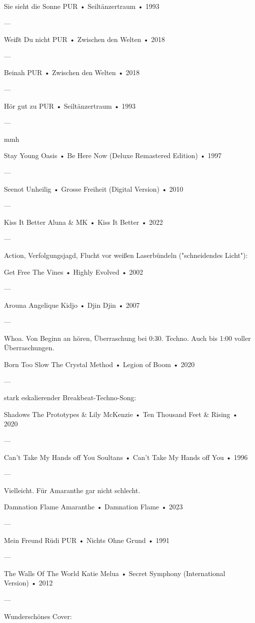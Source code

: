Sie sieht die Sonne
PUR
 •
Seiltänzertraum
 •
1993

—

Weißt Du nicht
PUR
 •
Zwischen den Welten
 •
2018

—

Beinah
PUR
 •
Zwischen den Welten
 •
2018

—

Hör gut zu
PUR
 •
Seiltänzertraum
 •
1993

—

mmh ~

Stay Young
Oasis
 •
Be Here Now (Deluxe Remastered Edition)
 •
1997

—

Seenot
Unheilig
 •
Grosse Freiheit (Digital Version)
 •
2010

—

Kiss It Better
Aluna
 &
MK
 •
Kiss It Better
 • 2022

—

Action, Verfolgungsjagd, Flucht vor weißen Laserbündeln ("schneidendes Licht"):

Get Free
The Vines
 •
Highly Evolved
 • 2002

—

Arouna
Angelique Kidjo
 •
Djin Djin
 • 2007

—

Whoa. Von Beginn an hören, Überraschung bei 0:30. Techno. Auch bis 1:00 voller Überraschungen.

Born Too Slow
The Crystal Method
 •
Legion of Boom
 • 2020

—

stark eskalierender Breakbeat-Techno-Song:

Shadows
The Prototypes
 &
Lily McKenzie
 •
Ten Thousand Feet & Rising
 • 2020

—

Can't Take My Hands off You
Soultans
 •
Can't Take My Hands off You
 • 1996

—

Vielleicht. Für Amaranthe gar nicht schlecht.

Damnation Flame
Amaranthe
 •
Damnation Flame
 •
2023

—

Mein Freund Rüdi
PUR
 •
Nichts Ohne Grund
 •
1991

—

The Walls Of The World
Katie Melua
 •
Secret Symphony (International Version)
 •
2012

—

Wunderschönes Cover:


